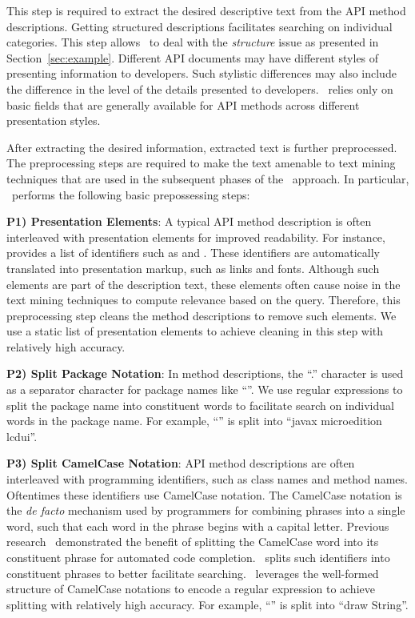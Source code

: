 This step is required to extract the desired descriptive text from the API method descriptions.
Getting structured descriptions facilitates searching on individual categories.
This step allows \tool\ to deal with the \textit{structure} issue as presented in Section~\ref{sec:example}.
Different API documents may have different styles of presenting information to developers.
Such stylistic differences may also include the difference in the level of the details presented to developers.
\tool\ relies only on basic fields that are generally available for API methods across different presentation styles. 

After extracting the desired information, extracted text is further preprocessed.
The preprocessing steps are required to make the text amenable to text mining techniques
that are used in the subsequent phases of the \tool\ approach.
In particular, \tool\ performs the following basic prepossessing steps: 

\textbf{P1) Presentation Elements}: A typical API method description is often interleaved with presentation elements for improved readability. For instance,  provides a list of identifiers such as   and  . These identifiers are automatically translated into presentation markup, such as links and fonts. Although such elements are part of the description text, these elements often cause noise in the text mining techniques to compute relevance based on the query. Therefore, this preprocessing step cleans the method descriptions to remove such elements. We use a static list of presentation elements to achieve cleaning in this step with relatively high accuracy.
	
\textbf{P2) Split Package Notation}: In method descriptions, the ``.'' character is used as a separator character for package names like ``''. We use regular expressions to split the package name into constituent words to facilitate search on individual words in the package name. For example, ``'' is split into ``javax microedition lcdui''.

\textbf{P3) Split CamelCase Notation}: API method descriptions are often interleaved with programming identifiers, such as class names and method names.
Oftentimes these identifiers use CamelCase notation.
The CamelCase notation is the \textit{de facto} mechanism used by programmers for combining phrases into a single word, such that each word in the phrase begins with a capital letter.
Previous research~\cite{Little2009} demonstrated the benefit of splitting the CamelCase word into its constituent phrase for automated code completion.
\tool\ splits such identifiers into constituent phrases to better facilitate searching.
\tool\ leverages the well-formed structure of CamelCase notations to encode a regular expression to achieve splitting with relatively high accuracy.
For example, ``'' is split into ``draw String''.   

